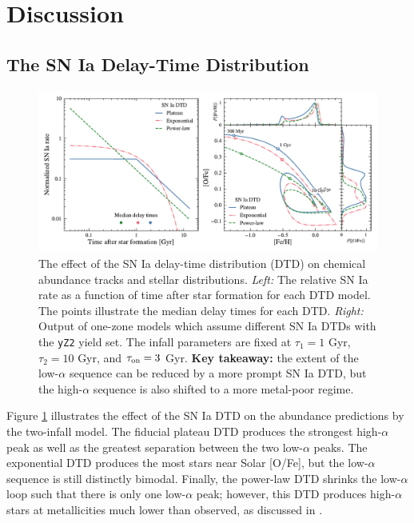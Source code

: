 \documentclass[twocolumn,twocolappendix,linenumbers]{aastex631}
\begin{document}
\section{Discussion}
\label{sec:discussion}

\subsection{The SN Ia Delay-Time Distribution}
\label{sec:dtd-discussion}

\begin{figure}
    \centering
    \includegraphics{figures/delay_time_distribution.pdf}
    \caption{The effect of the SN Ia delay-time distribution (DTD) on chemical abundance tracks and stellar distributions. {\it Left:} The relative SN Ia rate as a function of time after star formation for each DTD model. The points illustrate the median delay times for each DTD. {\it Right:} Output of one-zone models which assume different SN Ia DTDs with the {\tt yZ2} yield set. The infall parameters are fixed at $\tau_1=1$ Gyr, $\tau_2=10$ Gyr, and $\tau_{\rm on}=3$ Gyr. {\bf Key takeaway:} the extent of the low-$\alpha$ sequence can be reduced by a more prompt SN Ia DTD, but the high-$\alpha$ sequence is also shifted to a more metal-poor regime.}
    \label{fig:dtd}
\end{figure}

Figure \ref{fig:dtd} illustrates the effect of the SN Ia DTD on the abundance predictions by the two-infall model. The fiducial plateau DTD produces the strongest high-$\alpha$ peak as well as the greatest separation between the two low-$\alpha$ peaks. The exponential DTD produces the most stars near Solar [O/Fe], but the low-$\alpha$ sequence is still distinctly bimodal. Finally, the power-law DTD shrinks the low-$\alpha$ loop such that there is only one low-$\alpha$ peak; however, this DTD produces high-$\alpha$ stars at metallicities much lower than observed, as discussed in \citet{dubay_galactic_2024}.
\end{document}
